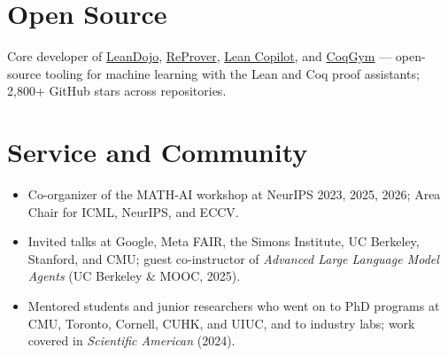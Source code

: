 \documentclass[10pt]{article}
\begin{document}
\section{Open Source}

Core developer of \href{https://github.com/lean-dojo/LeanDojo}{LeanDojo},
\href{https://github.com/lean-dojo/ReProver}{ReProver},
\href{https://github.com/lean-dojo/LeanCopilot}{Lean Copilot}, and
\href{https://github.com/princeton-vl/CoqGym}{CoqGym} --- open-source tooling for machine
learning with the Lean and Coq proof assistants; 2,800+ GitHub stars across repositories.

\section{Service and Community}

\begin{itemize}
  \item Co-organizer of the MATH-AI workshop at NeurIPS 2023, 2025, 2026; Area Chair for
        ICML, NeurIPS, and ECCV.
  \item Invited talks at Google, Meta FAIR, the Simons Institute, UC Berkeley, Stanford,
        and CMU; guest co-instructor of \textit{Advanced Large Language Model
        Agents} (UC Berkeley \& MOOC, 2025).
  \item Mentored students and junior researchers who went on to PhD programs at CMU,
        Toronto, Cornell, CUHK, and UIUC, and to industry labs; work covered in
        \textit{Scientific American} (2024).
\end{itemize}
\end{document}
